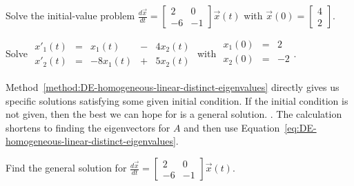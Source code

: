 \documentclass[../main.tex]{subfiles}
\begin{document}
\begin{example}
  Solve the initial-value problem \( \frac{d\vec{x}}{dt} = \begin{bmatrix} 2   & 0  \\ -6 & -1 \end{bmatrix} \vec{x}(t) \) with \(\vec{x}(0) = \begin{bmatrix} 4 \\ 2 \end{bmatrix}\).

\end{example}
\clearpage

\begin{example}
  Solve 
  \(
  \begin{array}{rcrcr}
    x'_{1}(t) &=&    x_{1}(t) &-& 4x_{2}(t) \\
    x'_{2}(t) &=& -8 x_{1}(t) &+& 5x_{2}(t)
  \end{array}
  \) with \(
  \begin{array}{rcr}
    x_{1}(0) &=&  2 \\
    x_{2}(0) &=& -2 \\
  \end{array}
  \).

\end{example}
\clearpage


\faStar{} Method~\ref{method:DE-homogeneous-linear-distinct-eigenvalues} directly gives us specific solutions satisfying some given initial condition.  If the initial condition is not given, then the best we can hope for is a general solution.  .  The calculation shortens to finding the eigenvectors for \(A\) and then use Equation~\ref{eq:DE-homogeneous-linear-distinct-eigenvalues}.

\begin{example}
  Find the general solution for \( \frac{d\vec{x}}{dt} = \begin{bmatrix} 2   & 0  \\ -6 & -1 \end{bmatrix} \vec{x}(t) \).

\end{example}
\end{document}
